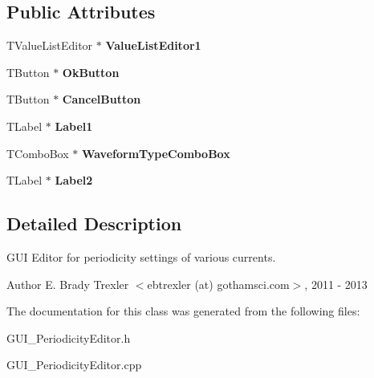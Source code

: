 \subsection*{Public Attributes}
\begin{DoxyCompactItemize}
\item 
\hypertarget{class_t_periodicity_form_abe96fee6cde704ea5663c2c1a43e30f4}{T\+Value\+List\+Editor $\ast$ {\bfseries Value\+List\+Editor1}}\label{class_t_periodicity_form_abe96fee6cde704ea5663c2c1a43e30f4}

\item 
\hypertarget{class_t_periodicity_form_af7c0dbe49e6b28026a16e32230cafa2d}{T\+Button $\ast$ {\bfseries Ok\+Button}}\label{class_t_periodicity_form_af7c0dbe49e6b28026a16e32230cafa2d}

\item 
\hypertarget{class_t_periodicity_form_a41b6b7cac8f7b7aa5710674a97e16d7b}{T\+Button $\ast$ {\bfseries Cancel\+Button}}\label{class_t_periodicity_form_a41b6b7cac8f7b7aa5710674a97e16d7b}

\item 
\hypertarget{class_t_periodicity_form_a29b23177f4216ee8a96b5dc1c4231e8e}{T\+Label $\ast$ {\bfseries Label1}}\label{class_t_periodicity_form_a29b23177f4216ee8a96b5dc1c4231e8e}

\item 
\hypertarget{class_t_periodicity_form_accef9585dcb1f56ff2ff902987c92f00}{T\+Combo\+Box $\ast$ {\bfseries Waveform\+Type\+Combo\+Box}}\label{class_t_periodicity_form_accef9585dcb1f56ff2ff902987c92f00}

\item 
\hypertarget{class_t_periodicity_form_a3eabb795215c595abb801ddcc07946e7}{T\+Label $\ast$ {\bfseries Label2}}\label{class_t_periodicity_form_a3eabb795215c595abb801ddcc07946e7}

\end{DoxyCompactItemize}


\subsection{Detailed Description}
G\+U\+I Editor for periodicity settings of various currents. 

\begin{DoxyAuthor}{Author}
E. Brady Trexler $<$ebtrexler (at) gothamsci.\+com$>$, 2011 -\/ 2013 
\end{DoxyAuthor}


The documentation for this class was generated from the following files\+:\begin{DoxyCompactItemize}
\item 
G\+U\+I\+\_\+\+Periodicity\+Editor.\+h\item 
G\+U\+I\+\_\+\+Periodicity\+Editor.\+cpp\end{DoxyCompactItemize}

